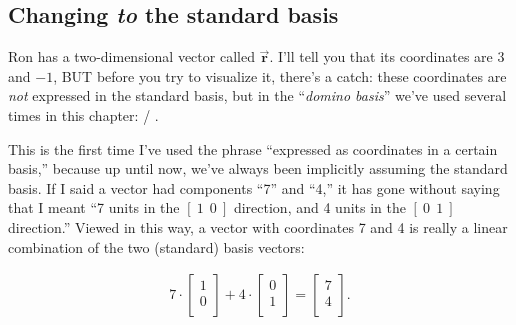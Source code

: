 \subsection{Changing \textit{to} the standard basis}

\label{changeOfBasis}

Ron has a two-dimensional vector called $\overrightarrow{\textbf{r}}$. I'll
tell you that its coordinates are $3$ and $-1$, BUT before you try to visualize
it, there's a catch: these coordinates are \textit{not} expressed in the
standard basis, but in the ``\textit{domino basis}'' we've used several times
in this chapter:
{\Large /}
.

This is the first time I've used the phrase ``expressed as coordinates in a
certain basis,'' because up until now, we've always been implicitly assuming
the standard basis. If I said a vector had components ``7'' and ``4,'' it has
gone without saying that I meant ``7 units in the $[\ 1\ \ 0\ ]$ direction, and
4 units in the $[\ 0\ \ 1\ ]$ direction.'' Viewed in this way, a vector with
coordinates 7 and 4 is really a linear combination of the two (standard) basis
vectors:

\vspace{-.15in}
\begin{align*}
7 \cdot \begin{bmatrix} 1 \\ 0 \\ \end{bmatrix} +
4 \cdot \begin{bmatrix} 0 \\ 1 \\ \end{bmatrix} = 
\begin{bmatrix} 7 \\ 4 \\ \end{bmatrix}.
\end{align*}
\vspace{-.15in}


